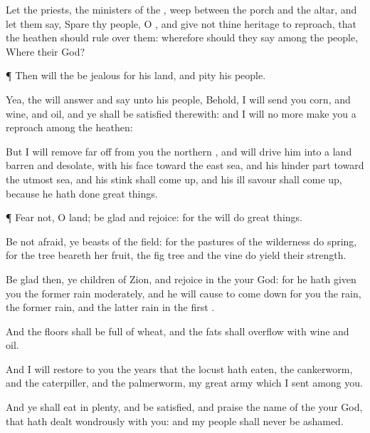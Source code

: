 {Let the
priests, the
ministers of the
{},
weep between the
porch and the
altar, and let them
say,
Spare thy
people, O
{}, and
give not thine
heritage to
reproach, that the
heathen should rule
over them: wherefore should they
say among the
people, Where
{} their
God?


\par }{\PP {}¶ Then will the
{} be
jealous for his
land, and
pity his
people.

Yea, the
{} will
answer and
say unto his
people, Behold, I will
send you
corn, and
wine, and
oil, and ye shall be
satisfied therewith: and I will no more
make you a
reproach among the
heathen:

But I will remove far
off from you the
northern
{}, and will
drive him into a
land
barren and
desolate, with his
face toward the
east
sea, and his hinder
part toward the
utmost
sea, and his
stink shall come
up, and his ill
savour shall come
up, because he hath
done great
things.


\par }{\PP {}¶
Fear not, O
land; be
glad and
rejoice: for the
{} will
do great
things.

Be not
afraid, ye
beasts of the
field: for the
pastures of the
wilderness do
spring, for the
tree
beareth her
fruit, the fig
tree and the
vine do
yield their
strength.

Be
glad then, ye
children of
Zion, and
rejoice in the
{} your
God: for he hath
given you the former
rain
moderately, and he will cause to come
down for you the
rain, the former
rain, and the latter
rain in the
first
{}.

And the
floors shall be
full of
wheat, and the
fats shall
overflow with
wine and
oil.

And I will
restore to you the
years that the
locust hath
eaten, the
cankerworm, and the
caterpiller, and the
palmerworm, my
great
army which I
sent among you.

And ye shall
eat in
plenty, and be
satisfied, and
praise the
name of the
{} your
God, that hath
dealt
wondrously with you: and my
people shall
never be
ashamed.

}
